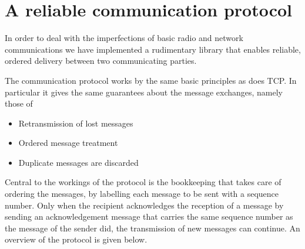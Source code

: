 
\section{A reliable communication protocol}

In order to deal with the imperfections of basic radio and network
communications we have implemented a rudimentary library that enables reliable,
ordered delivery between two communicating parties.

The communication protocol works by the same basic principles as does TCP. In
particular it gives the same guarantees about the message exchanges, namely
those of

\begin{itemize}

\item Retransmission of lost messages

\item Ordered message treatment %

\item Duplicate messages are discarded

\end{itemize}

Central to the workings of the protocol is the bookkeeping that takes care of
ordering the messages, by labelling each message to be sent with a sequence
number. Only when the recipient acknowledges the reception of a message by
sending an acknowledgement message that carries the same sequence number as the
message of the sender did, the transmission of new messages can continue.  An
overview of the protocol is given below.

